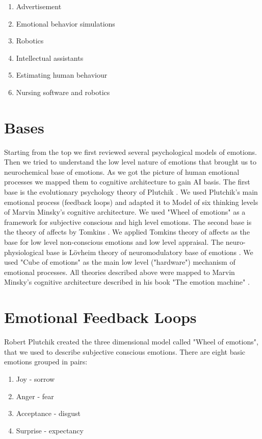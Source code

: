 \begin{enumerate}
 \item  Advertisement
 \item  Emotional behavior simulations
 \item  Robotics
 \item  Intellectual assistants
 \item  Estimating human behaviour
 \item  Nursing software and robotics
\end{enumerate}

\section{Bases}

Starting from the top we first reviewed several psychological models of emotions. Then we tried to understand the low level nature of emotions that brought us to neurochemical base of emotions. As we got the picture of human emotional processes we mapped them to cognitive architecture to gain AI basis. The first base is the evolutionary psychology theory of Plutchik \cite{natureofemotions}. We used Plutchik's main emotional process (feedback loops) and adapted it to Model of six \cite{emotionmachine} thinking levels of Marvin Minsky's cognitive architecture. We used "Wheel of emotions" \cite{natureofemotions} as a framework for subjective conscious and high level emotions.
The second base is the theory of affects by Tomkins \cite{primer_affect_psychology, tomkins1, tomkins2, tomkins3}. We applied Tomkins theory of affects as the base for low level non-conscious emotions and low level appraisal.
The neuro-physiological base is L\"{o}vheim theory of neuromodulatory base of emotions \cite{cubeofemotions}. We used "Cube of emotions" as the main low level ("hardware") mechanism of emotional processes.
All theories described above were mapped to Marvin Minsky's cognitive architecture described in his book "The emotion machine" \cite{emotionmachine}.

\section{Emotional Feedback Loops}

Robert Plutchik created the three dimensional model \cite{natureofemotions} called "Wheel of emotions", that we used to describe subjective conscious emotions. There are eight basic emotions grouped in pairs:

\begin{enumerate}
 \item  Joy - sorrow
 \item  Anger - fear
 \item  Acceptance - disgust
 \item  Surprise - expectancy
\end{enumerate}

